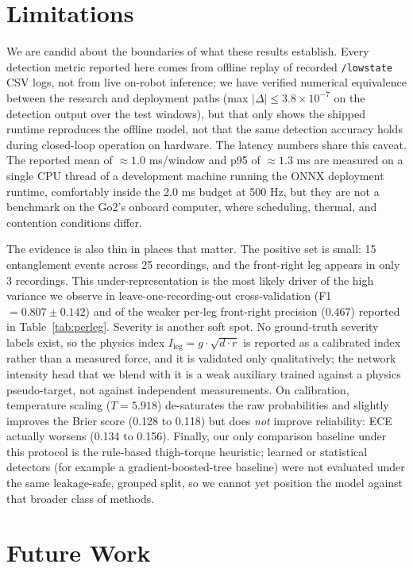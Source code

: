 \documentclass[conference]{IEEEtran}
\begin{document}
\section{Limitations}

We are candid about the boundaries of what these results establish. Every detection metric reported here comes from offline replay of recorded \texttt{/lowstate} CSV logs, not from live on-robot inference; we have verified numerical equivalence between the research and deployment paths (max $|\Delta| \le 3.8\times10^{-7}$ on the detection output over the test windows), but that only shows the shipped runtime reproduces the offline model, not that the same detection accuracy holds during closed-loop operation on hardware. The latency numbers share this caveat. The reported mean of $\approx 1.0$ ms/window and p95 of $\approx 1.3$ ms are measured on a single CPU thread of a development machine running the ONNX deployment runtime, comfortably inside the 2.0 ms budget at 500 Hz, but they are not a benchmark on the Go2's onboard computer, where scheduling, thermal, and contention conditions differ.

The evidence is also thin in places that matter. The positive set is small: 15 entanglement events across 25 recordings, and the front-right leg appears in only 3 recordings. This under-representation is the most likely driver of the high variance we observe in leave-one-recording-out cross-validation (F1 $= 0.807 \pm 0.142$) and of the weaker per-leg front-right precision (0.467) reported in Table~\ref{tab:perleg}. Severity is another soft spot. No ground-truth severity labels exist, so the physics index $I_{\text{leg}} = g\cdot\sqrt{d\cdot r}$ is reported as a calibrated index rather than a measured force, and it is validated only qualitatively; the network intensity head that we blend with it is a weak auxiliary trained against a physics pseudo-target, not against independent measurements. On calibration, temperature scaling ($T = 5.918$) de-saturates the raw probabilities and slightly improves the Brier score (0.128 to 0.118) but does \emph{not} improve reliability: ECE actually worsens (0.134 to 0.156). Finally, our only comparison baseline under this protocol is the rule-based thigh-torque heuristic; learned or statistical detectors (for example a gradient-boosted-tree baseline) were not evaluated under the same leakage-safe, grouped split, so we cannot yet position the model against that broader class of methods.

\section{Future Work}
\end{document}
